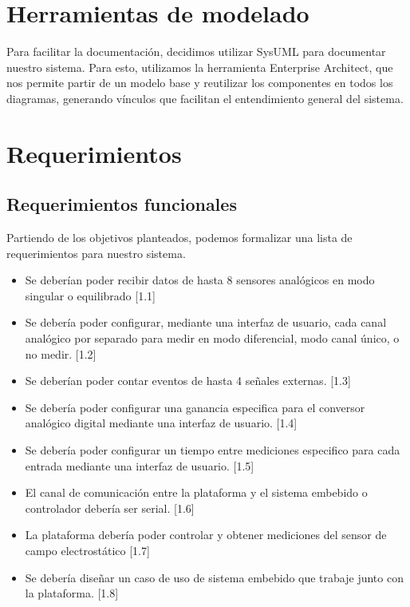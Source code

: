 \section{Herramientas de modelado} %
\label{sec:herramientas_de_modelado}

Para facilitar la documentación, decidimos utilizar SysUML para documentar nuestro sistema. Para esto, utilizamos la herramienta Enterprise Architect, que nos permite partir de un modelo base y reutilizar los componentes en todos los diagramas, generando vínculos que facilitan el entendimiento general del sistema. 


\section{Requerimientos} %
\label{sec:requerimientos}

\subsection{Requerimientos funcionales} %
\label{sub:requerimientos_funcionales}

Partiendo de los objetivos planteados, podemos formalizar una lista de requerimientos para nuestro sistema.

\begin{itemize}
	\item Se deberían poder recibir datos de hasta 8 sensores analógicos en modo singular o equilibrado [1.1]
	\item Se debería poder configurar, mediante una interfaz de usuario, cada canal analógico por separado para medir en modo diferencial, modo canal único, o no medir. [1.2]
	\item Se deberían poder contar eventos de hasta 4 señales externas. [1.3]
	\item Se debería poder configurar una ganancia especifica para el conversor analógico digital mediante una interfaz de usuario. [1.4]
	\item Se debería poder configurar un tiempo entre mediciones especifico para cada entrada mediante una interfaz de usuario. [1.5]
	\item El canal de comunicación entre la plataforma y el sistema embebido o controlador debería ser serial. [1.6]
	\item La plataforma debería poder controlar y obtener mediciones del sensor de campo electrostático [1.7]
	\item Se debería diseñar un caso de uso de sistema embebido que trabaje junto con la plataforma. [1.8]
\end{itemize}

